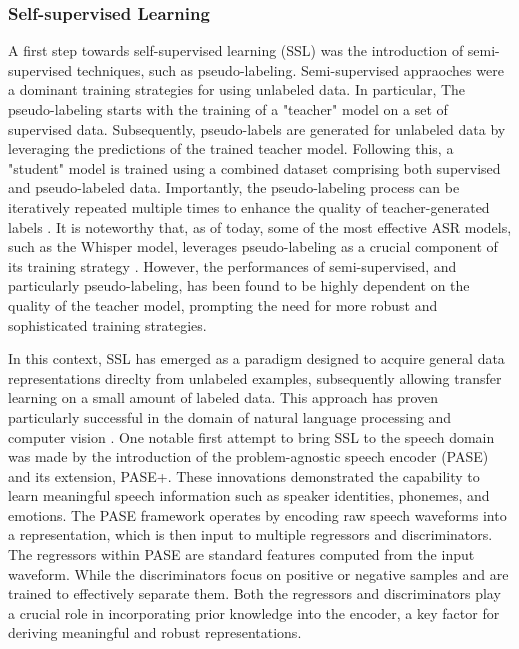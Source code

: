 \subsubsection{Self-supervised Learning}
A first step towards self-supervised learning  (SSL) was the introduction of semi-supervised techniques, such as pseudo-labeling. Semi-supervised appraoches were a dominant training strategies for using unlabeled data. In particular, The pseudo-labeling starts with the training of a "teacher" model on a set of supervised data. Subsequently, pseudo-labels are generated for unlabeled data by leveraging the predictions of the trained teacher model. Following this, a "student" model is trained using a combined dataset comprising both supervised and pseudo-labeled data. Importantly, the pseudo-labeling process can be iteratively repeated multiple times to enhance the quality of teacher-generated labels \cite{zavaliagkos1998utilizing,ma2006unsupervised}. It is noteworthy that, as of today, some of the most effective ASR models, such as the Whisper model, leverages pseudo-labeling as a crucial component of its training strategy \cite{radford2023robust}. However, the performances of semi-supervised, and particularly pseudo-labeling, has been found to be highly dependent on the quality of the teacher model, prompting the need for more robust and sophisticated training strategies.

In this context, SSL has emerged as a paradigm designed to acquire general data representations direclty from unlabeled examples, subsequently allowing transfer learning on a small amount of labeled data. This approach has proven particularly successful in the domain of natural language processing \cite{sarzynska2021detecting} and computer vision \cite{henaff2020data}.
One notable first attempt to bring SSL to the speech domain was made by the introduction of the problem-agnostic speech encoder (PASE) and its extension, PASE+. These innovations demonstrated the capability to learn meaningful speech information such as speaker identities, phonemes, and emotions. The PASE framework operates by encoding raw speech waveforms into a representation, which is then input to multiple regressors and discriminators. The regressors within PASE are standard features computed from the input waveform. While the discriminators focus on positive or negative samples and are trained to effectively separate them. Both the regressors and discriminators play a crucial role in incorporating prior knowledge into the encoder, a key factor for deriving meaningful and robust representations. 

